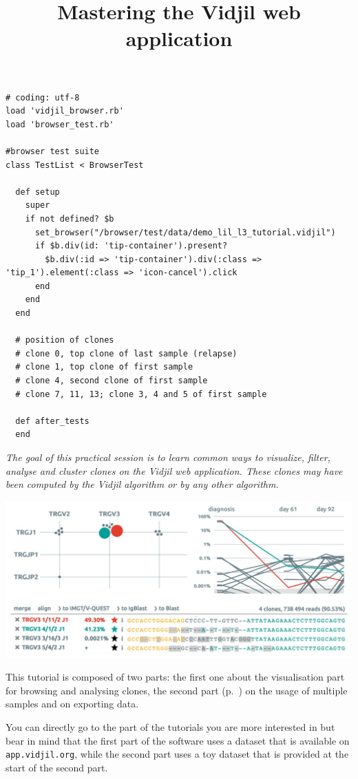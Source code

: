 \documentclass[11pt]{report}
\title{Mastering the Vidjil web application
}
\begin{document}
\begin{verbatim}
# coding: utf-8
load 'vidjil_browser.rb'
load 'browser_test.rb'

#browser test suite
class TestList < BrowserTest

  def setup
    super
    if not defined? $b
      set_browser("/browser/test/data/demo_lil_l3_tutorial.vidjil")
      if $b.div(id: 'tip-container').present?
        $b.div(:id => 'tip-container').div(:class => 'tip_1').element(:class => 'icon-cancel').click
      end
    end
  end

  # position of clones
  # clone 0, top clone of last sample (relapse)
  # clone 1, top clone of first sample
  # clone 4, second clone of first sample
  # clone 7, 11, 13; clone 3, 4 and 5 of first sample

  def after_tests
  end
\end{verbatim}


\maketitle

\textit{The goal of this practical session is to learn
common ways to visualize, filter, analyse and cluster clones
on the Vidjil web application.
%
These clones may have been computed by the Vidjil algorithm
or by any other algorithm.}

\bigskip


\centerline{\includegraphics[width=\textwidth]{vidjil-combined.jpg}}

\bigskip

This tutorial is composed of two parts: the first one about the visualisation
part for browsing and analysing clones, the second part
(p.~\pageref{sec:part2}) on the usage of multiple samples and on exporting
data.

You can directly go to the part of the tutorials you are more interested in
but bear in mind that the first part of the software uses a dataset that is
available on \texttt{app.vidjil.org}, while the second part uses a toy dataset
that is provided at the start of the second part.
\end{document}
